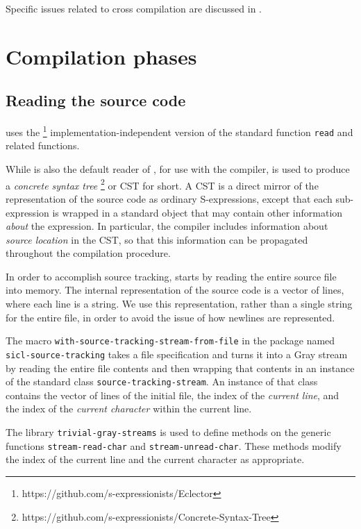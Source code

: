 Specific issues related to cross compilation are discussed in
.

\section{Compilation phases}

\subsection{Reading the source code}

\sysname{} uses the \eclector{}%
\footnote{https://github.com/s-expressionists/Eclector}
implementation-independent version of the standard function
\texttt{read} and related functions.

While \eclector{} is also the default reader of \sysname{}, for use
with the compiler, \eclector{} is used to produce a \emph{concrete
  syntax tree}%
\footnote{https://github.com/s-expressionists/Concrete-Syntax-Tree} or
CST for short.  A CST is a direct mirror of the representation of the
source code as ordinary S-expressions, except that each sub-expression
is wrapped in a standard object that may contain other information
\emph{about} the expression.  In particular, the \sysname{} compiler
includes information about \emph{source location} in the CST, so that
this information can be propagated throughout the compilation
procedure.

In order to accomplish source tracking, \sysname{} starts by reading
the entire source file into memory.  The internal representation of
the source code is a vector of lines, where each line is a string.  We
use this representation, rather than a single string for the entire
file, in order to avoid the issue of how newlines are represented.

The macro \texttt{with-source-tracking-stream-from-file} in the
package named \texttt{sicl-source-tracking} takes a file
specification and turns it into a Gray stream by reading the entire
file contents and then wrapping that contents in an instance of the
standard class \texttt{source-tracking-stream}.  An instance of that
class contains the vector of lines of the initial file, the index of the
\emph{current line}, and the index of the \emph{current character}
within the current line.

The library \texttt{trivial-gray-streams} is used to define methods on
the generic functions \texttt{stream-read-char} and
\texttt{stream-unread-char}.  These methods modify the index of the
current line and the current character as appropriate.

